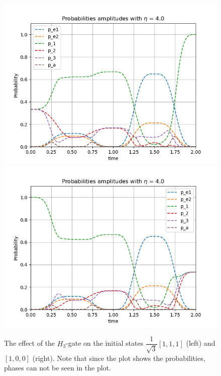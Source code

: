 \begin{figure}[H]
\label{fig:pop_H}
\includegraphics[scale=0.5]{figures/pop_plot_H111.png}
\includegraphics[scale=0.5]{figures/pop_plot_H100.png}
\caption{The effect of the $H_3$-gate on the initial states $\dfrac{1}{\sqrt{3}}[1,1,1]$ (left) and $[1,0,0]$ (right). Note that since the plot shows the probabilities, phases can not be seen in the plot.}
\end{figure}



